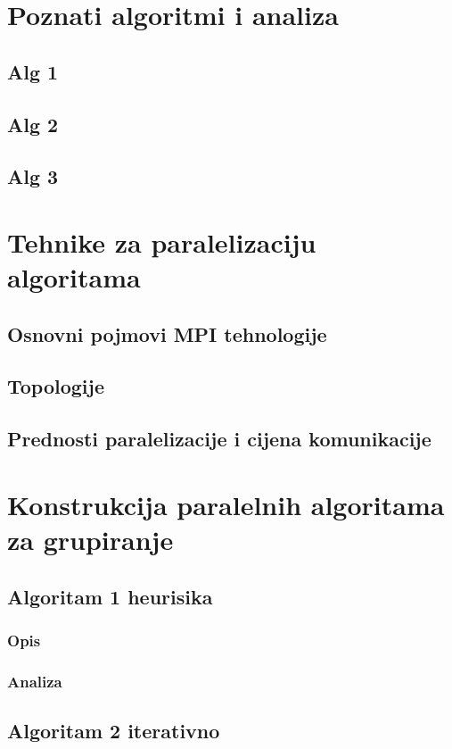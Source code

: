 \documentclass[a4paper,twoside,12pt]{memoir} %
\begin{document}
\chapter{Poznati algoritmi i analiza}
\section{Alg 1}
\section{Alg 2}
\section{Alg 3}
\chapter{Tehnike za paralelizaciju algoritama}
\section[Osnovni pojmovi MPI tehnologije][mpi]{Osnovni pojmovi MPI tehnologije}
\section[Topologija][topologija]{Topologije}
\section[Prednosti paralelizacije i cijena komunikacije][pred-man-paralel]{Prednosti paralelizacije i cijena komunikacije}
\chapter{Konstrukcija paralelnih algoritama za grupiranje}
\section{Algoritam 1 heurisika}
\subsection{Opis}
\subsection{Analiza}
\section{Algoritam 2 iterativno}
\end{document}
